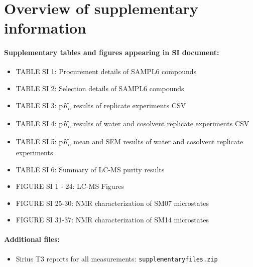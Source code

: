 \documentclass[9pt,lineno]{elife}
\newcommand{\pKa}{p\textit{K}\textsubscript{a}}
\begin{document}
\section{Overview of supplementary information}

\paragraph{Supplementary tables and figures appearing in SI document:}

\begin{itemize}
\item TABLE SI 1: Procurement details of SAMPL6 compounds  

\item TABLE SI 2: Selection details of SAMPL6 compounds  

\item TABLE SI 3: \pKa{} results of replicate experiments CSV

\item TABLE SI 4: \pKa{} results of water and cosolvent replicate experiments CSV

\item TABLE SI 5: \pKa{} mean and SEM results of water and cosolvent replicate experiments

\item TABLE SI 6: Summary of LC-MS purity results

\item FIGURE SI 1 - 24:  LC-MS Figures  

\item FIGURE SI 25-30: NMR characterization of SM07 microstates  

\item FIGURE SI 31-37: NMR characterization of SM14 microstates  
\end{itemize}

\paragraph{Additional files:}  
\begin{itemize}
\item Sirius T3 reports for all measurements: {\tt supplementary\textunderscore files.zip}
\end{itemize}
\end{document}
